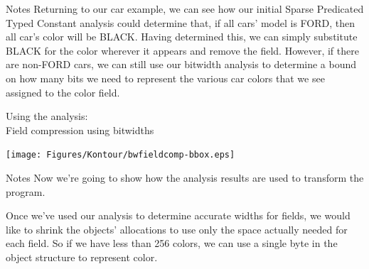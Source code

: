 \documentclass[%
pdf,
colorBG,
slideColor,
nototal,
oqe
]{prosper}
\newenvironment{talknotes}{\begin{slide}{Notes}\tiny}{\end{slide}}
\begin{document}
\begin{talknotes}
Returning to our car example, we can see how our initial Sparse
Predicated Typed Constant analysis could determine that, if all cars'
model is FORD, then all car's color will be BLACK.  Having determined
this, we can simply substitute BLACK for the color wherever it appears
and remove the field.  However, if there are non-FORD cars, we can
still use our bitwidth analysis to determine a bound on how many
bits we need to represent the various car colors that we see assigned
to the color field.
\end{talknotes}

\begin{slide}{{\small Using the analysis:}\\
              Field compression using bitwidths}

\begin{center}
\vspace{1cm}
\texttt{[image: Figures/Kontour/bwfieldcomp-bbox.eps]}
\end{center}
\end{slide}

\begin{talknotes}
Now we're going to show how the analysis results are used to transform
the program.

Once we've used our analysis to determine accurate widths for fields,
we would like to shrink the objects' allocations to use only the space
actually needed for each field.  So if we have less than 256 colors,
we can use a single byte in the object structure to represent color.
\end{talknotes}

\end{document}
